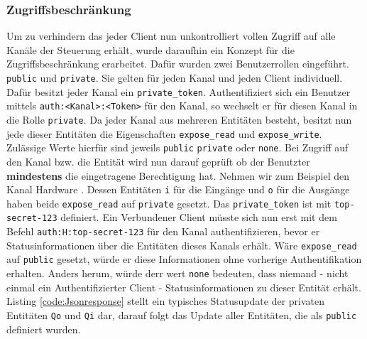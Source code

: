\subsubsection{Zugriffsbeschränkung}\label{chp:ums:websock:auth}
Um zu verhindern das jeder Client nun unkontrolliert vollen Zugriff auf alle Kanäle der Steuerung erhält, wurde daraufhin ein Konzept für die Zugriffsbeschränkung erarbeitet. Dafür wurden zwei Benutzerrollen eingeführt. \texttt{public} und \texttt{private}. Sie gelten für jeden Kanal und jeden Client individuell. Dafür besitzt jeder Kanal ein \texttt{private\_token}. Authentifiziert sich ein Benutzer mittels \texttt{auth:<Kanal>:<Token>} für den Kanal, so wechselt er für diesen Kanal in die Rolle \texttt{private}. Da jeder Kanal aus mehreren Entitäten besteht, besitzt nun jede dieser Entitäten die Eigenschaften \texttt{expose\_read} und \texttt{expose\_write}. Zulässige Werte hierfür sind jeweils \texttt{public} \texttt{private} oder \texttt{none}. Bei Zugriff auf den Kanal bzw. die Entität wird nun darauf geprüft ob der Benutzter \textbf{mindestens} die eingetragene Berechtigung hat. Nehmen wir zum Beispiel den Kanal Hardware . Dessen Entitäten \texttt{i} für die Eingänge und \texttt{o} für die Ausgänge haben beide \texttt{expose\_read} auf \texttt{private} gesetzt. Das \texttt{private\_token} ist mit \texttt{top-secret-123} definiert. Ein Verbundener Client müsste sich nun erst mit dem Befehl \texttt{auth:H:top-secret-123} für den Kanal authentifizieren, bevor er Statusinformationen über die Entitäten dieses Kanals erhält. Wäre \texttt{expose\_read} auf \texttt{public} gesetzt, würde er diese Informationen ohne vorherige Authentifikation erhalten. Anders herum, würde derr wert \texttt{none} bedeuten, dass niemand - nicht einmal ein Authentifizierter Client - Statusinformationen zu dieser Entität erhält. Listing \ref{code:Jsonresponse} stellt ein typisches Statusupdate der privaten Entitäten \texttt{Qo} und \texttt{Qi} dar, darauf folgt das Update aller Entitäten, die als \texttt{public} definiert wurden.  

